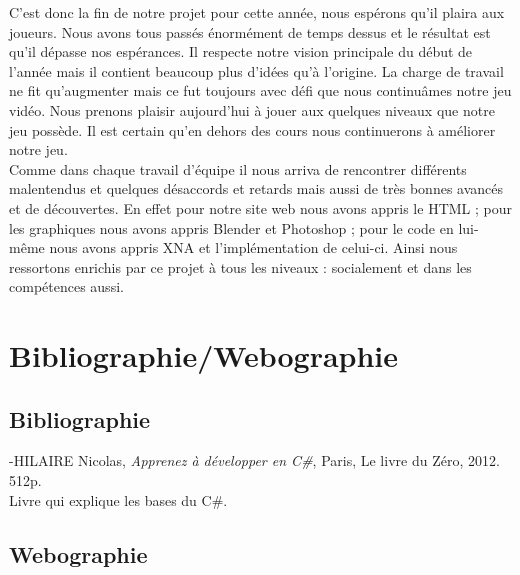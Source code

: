 \documentclass[12pt]{article}
\begin{document}
C’est donc la fin de notre projet pour cette année, nous espérons qu’il plaira aux joueurs. Nous avons tous passés énormément de temps dessus et le résultat est qu’il dépasse nos espérances. Il respecte notre vision principale du début de l’année mais il contient beaucoup plus d’idées qu’à l’origine. La charge de travail ne fit qu’augmenter mais ce fut toujours avec défi que nous continuâmes  notre jeu vidéo.  Nous prenons plaisir aujourd’hui à jouer aux quelques niveaux que notre jeu possède. Il est certain qu’en dehors des cours nous continuerons à améliorer notre jeu.\\

Comme dans chaque travail d’équipe il nous arriva de rencontrer différents malentendus et quelques désaccords et retards mais aussi de très bonnes avancés et de découvertes. En effet pour notre site web nous avons appris le HTML ; pour les graphiques nous avons appris Blender et Photoshop ; pour le code en lui-même nous avons appris XNA et l’implémentation de celui-ci. Ainsi nous ressortons enrichis par ce projet à tous les niveaux : socialement et dans les compétences aussi.\\

\newpage
\section{Bibliographie/Webographie}
\subsection{Bibliographie}
\noindent
-HILAIRE Nicolas, \textit{Apprenez à développer en C\#}, Paris, Le livre du Zéro, 2012. 512p. \\
Livre qui explique les bases du C\#. 

\subsection{Webographie}
\end{document}
